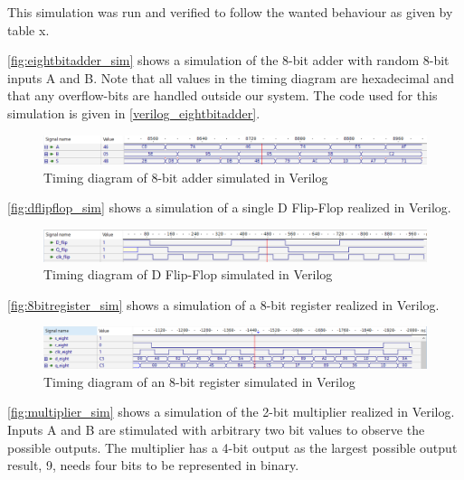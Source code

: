 This simulation was run and verified to follow the wanted behaviour as given by table x.

\autoref{fig:eightbitadder_sim} shows a simulation of the 8-bit adder with random 8-bit inputs A and B. Note that all values in the timing diagram are hexadecimal and that any overflow-bits are handled outside our system. The code used for this simulation is given in \autoref{verilog_eightbitadder}.

\begin{figure}[H]
    \centering
    \includegraphics[width=\textwidth]{Figures/Test of eightbitadder.png}
    \caption{Timing diagram of 8-bit adder simulated in Verilog}
    \label{fig:eightbitadder_sim}
\end{figure}

\autoref{fig:dflipflop_sim} shows a simulation of a single D Flip-Flop realized in Verilog.

\begin{figure}[H]
    \centering
    \includegraphics[width=\textwidth]{Figures/Test of Dflipflop.png}
    \caption{Timing diagram of D Flip-Flop simulated in Verilog}
    \label{fig:dflipflop_sim}
\end{figure}

\autoref{fig:8bitregister_sim} shows a simulation of a 8-bit register realized in Verilog.

\begin{figure}[H]
    \centering
    \includegraphics[width=\textwidth]{Figures/VerilogPlot_8bitreg.png}
    \caption{Timing diagram of an 8-bit register simulated in Verilog}
    \label{fig:8bitregister_sim}
\end{figure}

\autoref{fig:multiplier_sim} shows a simulation of the 2-bit multiplier realized in Verilog. Inputs A and B are stimulated with arbitrary two bit values to observe the possible outputs. The multiplier has a 4-bit output as the largest possible output result, 9, needs four bits to be represented in binary.

